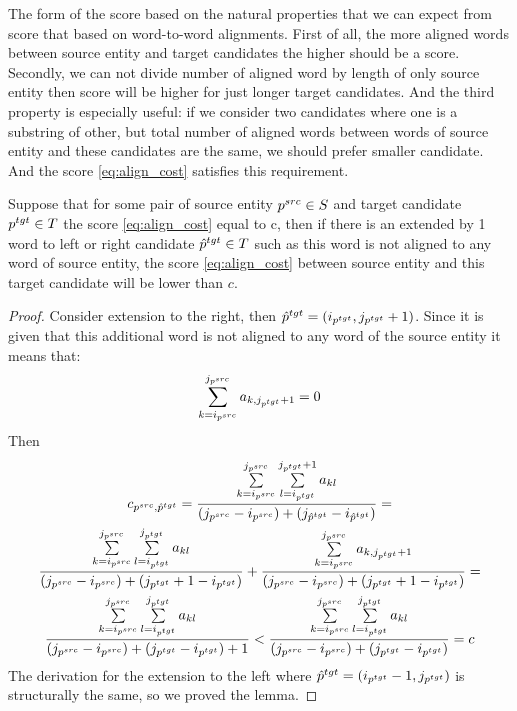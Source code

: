 The form of the score based on the natural properties that we can expect from score that based on word-to-word alignments.
First of all, the more aligned words between source entity and target candidates the higher should be a score.
Secondly, we can not divide number of aligned word by length of only source entity then
score will be higher for just longer target candidates.
And the third property is especially useful: if we consider two candidates where one is a
substring of other, but total number of aligned words between words of
source entity and these candidates are the same, we should prefer smaller candidate.
And the score \eqref{eq:align_cost} satisfies this requirement.
\begin{lemma} \label{lemma:align_cost_decrease}
    Suppose that for some pair of source entity \( p^{src} \in S \) and target candidate \( p^{tgt} \in T \)
    the score \eqref{eq:align_cost} equal to c, then if there is an extended by 1 word to left or
    right candidate \( \hat{p}^{tgt} \in T \) such as this word is not aligned to any word of source
    entity, the score \eqref{eq:align_cost} between source entity and this target candidate
    will be lower than \( c \).
\end{lemma}
\begin{proof}
    Consider extension to the right, then \( \hat{p}^{tgt} = (i_{p^{tgt}}, j_{p^{tgt}} + 1) \). Since it is
    given that this additional word is not aligned to any word of the source entity it means that:
    \[
        \sum\limits_{k=i_{p^{src}}}^{j_{p^{src}}} a_{k,j_{p^{tgt}} + 1} = 0
    \]
    Then
    \begin{multline*}
        c_{p^{src}, \hat{p}^{tgt}} =
        \frac{\sum\limits_{k=i_{p^{src}}}^{j_{p^{src}}} \sum\limits_{l=i_{p^{tgt}}}^{j_{p^{tgt}} + 1} a_{kl}}
        {(j_{p^{src}} - i_{p^{src}}) + (j_{\hat{p}^{tgt}} - i_{\hat{p}^{tgt}})} =                                \\
        \frac{\sum\limits_{k=i_{p^{src}}}^{j_{p^{src}}} \sum\limits_{l=i_{p^{tgt}}}^{j_{p^{tgt}}} a_{kl}}
        {(j_{p^{src}} - i_{p^{src}}) + (j_{p^{tgt}} + 1 - i_{p^{tgt}})} +
        \frac{\sum\limits_{k=i_{p^{src}}}^{j_{p^{src}}} a_{k,j_{p^{tgt}} + 1}}
        {(j_{p^{src}} - i_{p^{src}}) + (j_{p^{tgt}} + 1 - i_{p^{tgt}})} =                                        \\
        \frac{\sum\limits_{k=i_{p^{src}}}^{j_{p^{src}}} \sum\limits_{l=i_{p^{tgt}}}^{j_{p^{tgt}}} a_{kl}}
        {(j_{p^{src}} - i_{p^{src}}) + (j_{p^{tgt}} - i_{p^{tgt}}) + 1} <
        \frac{\sum\limits_{k=i_{p^{src}}}^{j_{p^{src}}} \sum\limits_{l=i_{p^{tgt}}}^{j_{p^{tgt}}} a_{kl}}
        {(j_{p^{src}} - i_{p^{src}}) + (j_{p^{tgt}} - i_{p^{tgt}})} = c
    \end{multline*}
    The derivation for the extension to the left where \( \hat{p}^{tgt} = (i_{p^{tgt}} - 1, j_{p^{tgt}}) \) is structurally the same, so we
    proved the lemma.
\end{proof}

